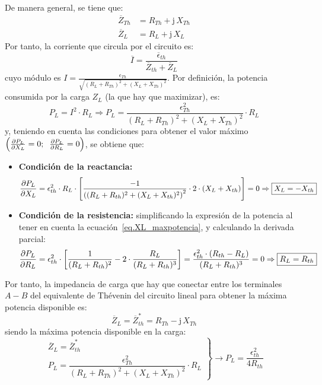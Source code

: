 \documentclass[11pt]{book} %
\numberwithin{dummy}{section}
\theoremstyle{ocrenumbox}
\theoremstyle{blacknumex}
\theoremstyle{blacknumbox}
\theoremstyle{ocrenum}
\begin{document}
De manera general, se tiene que: 
\begin{align*}
  \overline{Z}_{Th} &= R_{Th} + \mathrm{j}\,X_{Th}\\
  \overline{Z}_L &= R_L + \mathrm{j}\,X_L
\end{align*}
Por tanto, la corriente que circula por el circuito es: 
\begin{equation*}
\overline{I} = \frac{\overline{\epsilon}_{th}}{\overline{Z}_{th} + \overline{Z}_L}
\end{equation*}
cuyo módulo es $I=\frac{\epsilon_{Th}}{\sqrt{(R_L+R_{Th})^2+(X_L+X_{Th})^2}}$. Por definición, la potencia consumida por la carga $Z_L$ (la que hay que maximizar), es: 
\begin{equation*}
   P_L= I^2 \cdot R_L\Rightarrow P_L = \dfrac{\epsilon_{Th}^2}{{(R_L+R_{Th})^2+(X_L+X_{Th})^2}} \cdot R_L
\end{equation*}
y, teniendo en cuenta las condiciones para obtener el valor máximo $\left(\diffp{P_L}{X_L} = 0;\;\;    \diffp{P_L}{R_L} = 0\right)$, se obtiene que: 
\begin{itemize}
    \item \textbf{Condición de la reactancia:}
    \begin{equation}\label{eq.XL_maxpotencia}
        \diffp{P_L}{X_L} = \epsilon^2_{th} \cdot R_L \cdot \left[\frac{-1}{\left((R_L + R_{th})^2 + (X_L + X_{th})^2\right)^2} \cdot 2 \cdot (X_L + X_{th})\right]=0\Rightarrow \boxed{X_L = - X_{th}}
    \end{equation}
    \item \textbf{Condición de la resistencia:} simplificando la expresión de la potencia al tener en cuenta la ecuación~\eqref{eq.XL_maxpotencia}, y calculando la derivada parcial: 
    \begin{equation}\label{eq.R_maxpotencia}
        \diffp{P_L}{R_L} = \epsilon^2_{th} \cdot \left[\frac{1}{(R_L + R_{th})^2} - 2 \cdot \frac{R_L}{(R_L + R_{th})^3}\right]= \frac{\epsilon^2_{th} \cdot (R_{th} - R_L)}{(R_L + R_{th})^3}=0\Rightarrow \boxed{R_L = R_{th}}
    \end{equation}
\end{itemize}
Por tanto, la impedancia de carga que hay que conectar entre los terminales $A-B$ del equivalente de Thévenin del circuito lineal para obtener la máxima potencia disponible es:
\begin{equation}
    \boxed{\overline{Z}_L = \overline{Z}_{th}^*=R_{Th}-\mathrm{j}\,X_{Th}}
\end{equation}
siendo la máxima potencia disponible en la carga:
\begin{equation}
  \left.
    \begin{matrix}
      \overline{Z}_L = \overline{Z}_{th}^*\\
      P_L = \dfrac{\epsilon_{Th}^2}{{(R_L+R_{Th})^2+(X_L+X_{Th})^2}} \cdot R_L
    \end{matrix} \right\}\rightarrow
  \boxed{P_L = \frac{\epsilon^2_{th}}{4 R_{th}}}
\end{equation}
\end{document}
